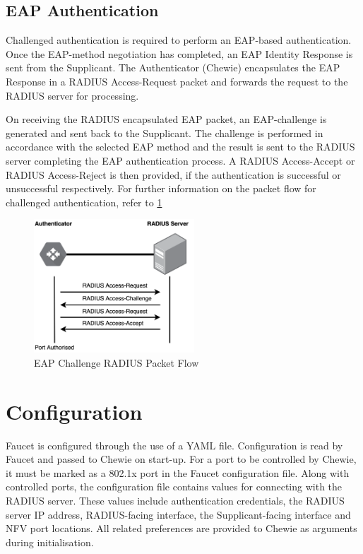 \subsection{EAP Authentication}
Challenged authentication is required to perform an EAP-based authentication. Once the EAP-method negotiation has completed, an EAP Identity Response is sent from the Supplicant. The Authenticator (Chewie) encapsulates the EAP Response in a RADIUS Access-Request packet and forwards the request to the RADIUS server for processing.

On receiving the RADIUS encapsulated EAP packet, an EAP-challenge is generated and sent back to the Supplicant. The challenge is performed in accordance with the selected EAP method and the result is sent to the RADIUS server completing the EAP authentication process. A RADIUS Access-Accept or RADIUS Access-Reject is then provided, if the authentication is successful or unsuccessful respectively. For further information on the packet flow for challenged authentication, refer to \ref{fig:challenge_radius}
\begin{figure}\begin{center}
    \includegraphics[height=5cm]{images/challenge_radius.png}
    \caption{EAP Challenge RADIUS Packet Flow}
    \label{fig:challenge_radius}
\end{center}\end{figure}


\section{Configuration}
Faucet is configured through the use of a YAML file. Configuration is read by Faucet and passed to Chewie on start-up. For a port to be controlled by Chewie, it must be marked as a 802.1x port in the Faucet configuration file.
Along with controlled ports, the configuration file contains values for connecting with the RADIUS server. These values include authentication credentials, the RADIUS server IP address, RADIUS-facing interface, the Supplicant-facing interface and NFV port locations.
All related preferences are provided to Chewie as arguments during initialisation.

